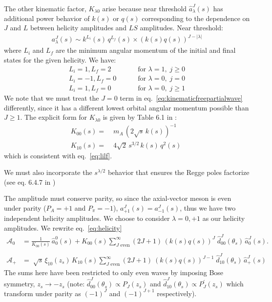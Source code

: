 \documentclass[10pt, aps,prd,amsmath,amssymb,superscriptaddress,onecolumn,
nofootinbib,showpacs,preprintnumbers]{revtex4-1}
\begin{document}
The other kinematic factor, \(K_{\lambda0}\) arise  because near threshold \(\hat{a}_\lambda^J(s)\) has additional power behavior of \(k(s)\) or \(q(s)\) corresponding to the dependence on \(J\) and \(L\) between helicity amplitudes and \(LS\) amplitudes. Near threshold:
  \begin{gather}
    a^J_\lambda(s) \sim k^{L_i}(s) \, q^{L_f}(s) \times (k(s)q(s))^{J- |\lambda|}
  \end{gather}
where \(L_i\) and \(L_f\) are the minimum angular momentum of the initial and final states for the given helicity. We have:
  \begin{align}
      L_i = 1 , L_f = 2& \qquad  \text{ for } \lambda = 1, \; j \geq 0 \nonumber \\
      L_i = -1, L_f = 0 &\qquad  \text{ for } \lambda = 0, \; j = 0  \label{eq:lilf} \\
      L_i = 1, L_f = 0 &\qquad  \text{ for } \lambda = 0, \;  j  \geq 1 \nonumber
  \end{align}
We note that we must treat the \(J=0\) term in eq.~\ref{eq:kinematicfreepartialwave} differently, since it has a different lowest orbital angular momentum possible than \(J\geq 1\). The explicit form for \(K_{\lambda0}\) is given by Table 6.1 in \cite{Collins}:
  \begin{align}
    \label{eq:k-factor}
    K_{00 }(s) =& \; m_A \, ( 2\sqrt{s} \, k(s))^{-1}\\ \nonumber
    K_{10}(s) =& \; 4 \sqrt{2} \,  s^{3/2} \, k(s) \, q^2(s)  \;
  \end{align}
which is consistent with eq.~\ref{eq:lilf}.

We must also incorporate the \(s^{\lambda/2}\) behavior that ensures the Regge poles factorize (see eq. 6.4.7 in \cite{Collins})

The amplitude must conserve parity, so since the axial-vector meson is even under parity (\( P_A = +1\) and \(P_\pi = -1\)), \(a_{+1}^J(s) = a_{-1}^J(s)\), thus we have two independent helicity amplitudes. We choose to consider \(\lambda = 0, +1\) as our helicity amplitudes.
We rewrite eq.~\ref{eq:helicity}
  \begin{align}
    \label{eq:model-helicity}
    \mathcal{A}_0 &= \frac{1}{K_{00}(s)} \, \hat{a}^0_0(s) + K_{00}(s) \sum_{J \text{ even}}^\infty (2J+1) \, (k(s)q(s))^J \; \hat{d}_{00}^J(\theta_s) \, \hat{a}^J_0(s). \\
    \nonumber \\
    \mathcal{A}_+ &= \; \sqrt{s} \, \xi_{10}(z_s) \, K_{10}(s) \sum_{J \text{ even}}^\infty (2J+1) \ (k(s)q(s))^{J-1} \;  \hat{d}_{10}^J(\theta_s) \, \hat{a}^J_+(s)
  \end{align}
The sums here have been restricted to only even waves by imposing Bose symmetry, \( z_s \to - z_s\) (note: \(\hat{d}^J_{00}(\theta_s) \propto P_J(z_s)\) and \(\hat{d}^J_{10}(\theta_s) \propto P^\prime_J(z_s)\) which transform under parity as \((-1)^J\) and \((-1)^{J+1}\) respectively).
\end{document}
